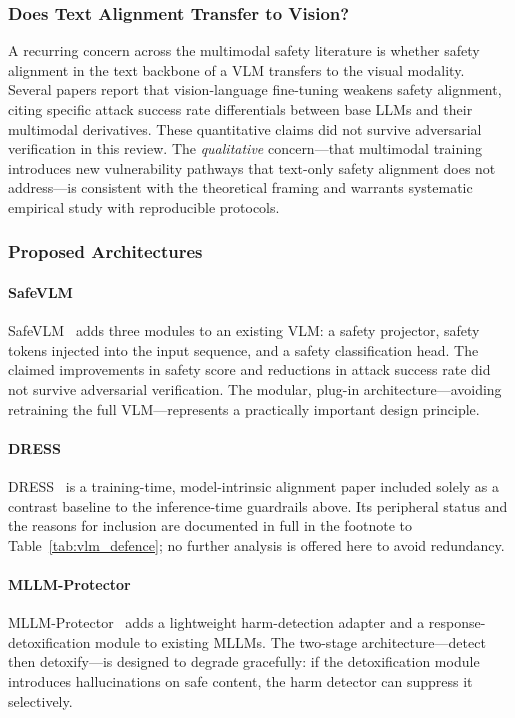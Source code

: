 \subsubsection{Does Text Alignment Transfer to Vision?}

A recurring concern across the multimodal safety literature is whether safety
alignment in the text backbone of a VLM transfers to the visual modality.
Several papers report that vision-language fine-tuning weakens safety alignment,
citing specific attack success rate differentials between base LLMs and their
multimodal derivatives.
These quantitative claims did not survive adversarial verification in this review.
The \emph{qualitative} concern---that multimodal training introduces new vulnerability
pathways that text-only safety alignment does not address---is consistent with the
theoretical framing and warrants systematic empirical study with reproducible protocols.

\subsubsection{Proposed Architectures}

\paragraph{SafeVLM}
SafeVLM~\cite{oh2024safevlm} adds three modules to an existing VLM: a safety
projector, safety tokens injected into the input sequence, and a safety
classification head.
The claimed improvements in safety score and reductions in attack success rate did
not survive adversarial verification.
The modular, plug-in architecture---avoiding retraining the full VLM---represents
a practically important design principle.

\paragraph{DRESS}
DRESS~\cite{chen2024dresssafety} is a training-time, model-intrinsic alignment
paper included solely as a contrast baseline to the inference-time guardrails above.
Its peripheral status and the reasons for inclusion are documented in full in the
footnote to Table~\ref{tab:vlm_defence}; no further analysis is offered here to
avoid redundancy.

\paragraph{MLLM-Protector}
MLLM-Protector~\cite{pi2024mllm} adds a lightweight harm-detection adapter and a
response-detoxification module to existing MLLMs.
The two-stage architecture---detect then detoxify---is designed to degrade gracefully:
if the detoxification module introduces hallucinations on safe content, the harm
detector can suppress it selectively.

